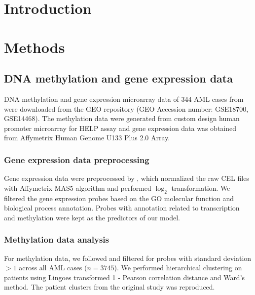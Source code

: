 \documentclass{article}
\begin{document}
\section{Introduction}



\section{Methods}


\subsection{\citet{figueroa2010dna} DNA methylation and gene expression data}

DNA methylation and gene expression microarray data of 344 AML cases from \citet{figueroa2010dna} were downloaded from the GEO repository (GEO Accession number: GSE18700, GSE14468). The methylation data were generated from custom design human promoter microarray for HELP assay and gene expression data was obtained from Affymetrix Human Genome U133 Plus 2.0 Array. 

\subsubsection{Gene expression data preprocessing}
Gene expression data were preprocessed by \citet{gentles2015prognostic}, which normalized the raw CEL files with Affymetrix MAS5 algorithm and performed $\log_2$ transformation. We filtered the gene expression probes based on the GO molecular function and biological process annotation. Probes with annotation related to transcription and methylation were kept as the predictors of our model.

\subsubsection{Methylation data analysis}
For methylation data, we followed \citet{figueroa2010dna} and filtered for probes with standard deviation $> 1$ across all AML cases ($n = 3745$). We performed hierarchical clustering on patients using Lingoes transformed 1 - Pearson correlation distance and Ward's method. The patient clusters from the original study was reproduced. 
\end{document}
